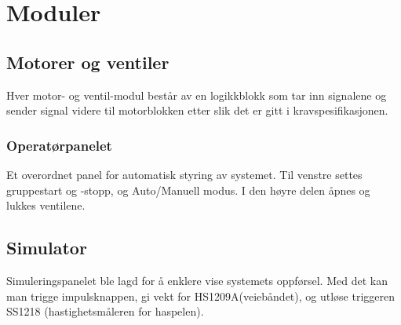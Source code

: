 \section{Moduler}
\subsection{Motorer og ventiler}
	Hver motor- og ventil-modul består av en logikkblokk som tar inn signalene og sender signal videre til motorblokken etter slik det er gitt i kravspesifikasjonen.

\subsubsection{Operatørpanelet}
	Et overordnet panel for automatisk styring av systemet. Til venstre settes gruppestart og -stopp, og Auto/Manuell modus. I den høyre delen åpnes og lukkes ventilene.

\subsection{Simulator}
	Simuleringspanelet ble lagd for å enklere vise systemets oppførsel. Med det kan man trigge impulsknappen, gi vekt for HS1209A(veiebåndet), og utløse triggeren SS1218 (hastighetsmåleren for haspelen).
